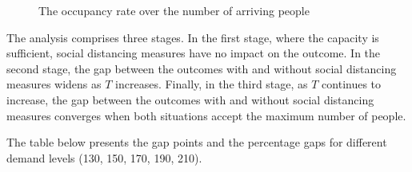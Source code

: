 \begin{figure}[h]
  \centering
  \caption{The occupancy rate over the number of arriving people}
  \label{Fig.lable}
\end{figure}

The analysis comprises three stages. In the first stage, where the capacity is sufficient, social distancing measures have no impact on the outcome. In the second stage, the gap between the outcomes with and without social distancing measures widens as $T$ increases. Finally, in the third stage, as $T$ continues to increase, the gap between the outcomes with and without social distancing measures converges when both situations accept the maximum number of people.

The table below presents the gap points and the percentage gaps for different demand levels (130, 150, 170, 190, 210).

